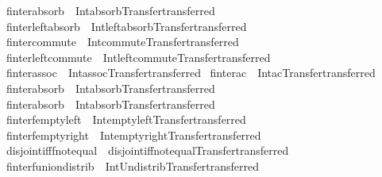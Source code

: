 \begin{isabellebody}
\isamarkupfalse%
\ finter{\isacharunderscore}absorb\ {\isacharequal}\ Int{\isacharunderscore}absorb{\isacharbrackleft}Transfer{\isachardot}transferred{\isacharbrackright}\isanewline
{}\isamarkupfalse%
\ finter{\isacharunderscore}left{\isacharunderscore}absorb\ {\isacharequal}\ Int{\isacharunderscore}left{\isacharunderscore}absorb{\isacharbrackleft}Transfer{\isachardot}transferred{\isacharbrackright}\isanewline
{}\isamarkupfalse%
\ finter{\isacharunderscore}commute\ {\isacharequal}\ Int{\isacharunderscore}commute{\isacharbrackleft}Transfer{\isachardot}transferred{\isacharbrackright}\isanewline
{}\isamarkupfalse%
\ finter{\isacharunderscore}left{\isacharunderscore}commute\ {\isacharequal}\ Int{\isacharunderscore}left{\isacharunderscore}commute{\isacharbrackleft}Transfer{\isachardot}transferred{\isacharbrackright}\isanewline
{}\isamarkupfalse%
\ finter{\isacharunderscore}assoc\ {\isacharequal}\ Int{\isacharunderscore}assoc{\isacharbrackleft}Transfer{\isachardot}transferred{\isacharbrackright}\isanewline
{}\isamarkupfalse%
\ finter{\isacharunderscore}ac\ {\isacharequal}\ Int{\isacharunderscore}ac{\isacharbrackleft}Transfer{\isachardot}transferred{\isacharbrackright}\isanewline
{}\isamarkupfalse%
\ finter{\isacharunderscore}absorb{}\ {\isacharequal}\ Int{\isacharunderscore}absorb{}{\isacharbrackleft}Transfer{\isachardot}transferred{\isacharbrackright}\isanewline
{}\isamarkupfalse%
\ finter{\isacharunderscore}absorb{}\ {\isacharequal}\ Int{\isacharunderscore}absorb{}{\isacharbrackleft}Transfer{\isachardot}transferred{\isacharbrackright}\isanewline
{}\isamarkupfalse%
\ finter{\isacharunderscore}fempty{\isacharunderscore}left\ {\isacharequal}\ Int{\isacharunderscore}empty{\isacharunderscore}left{\isacharbrackleft}Transfer{\isachardot}transferred{\isacharbrackright}\isanewline
{}\isamarkupfalse%
\ finter{\isacharunderscore}fempty{\isacharunderscore}right\ {\isacharequal}\ Int{\isacharunderscore}empty{\isacharunderscore}right{\isacharbrackleft}Transfer{\isachardot}transferred{\isacharbrackright}\isanewline
{}\isamarkupfalse%
\ disjoint{\isacharunderscore}iff{\isacharunderscore}fnot{\isacharunderscore}equal\ {\isacharequal}\ disjoint{\isacharunderscore}iff{\isacharunderscore}not{\isacharunderscore}equal{\isacharbrackleft}Transfer{\isachardot}transferred{\isacharbrackright}\isanewline
{}\isamarkupfalse%
\ finter{\isacharunderscore}funion{\isacharunderscore}distrib\ {\isacharequal}\ Int{\isacharunderscore}Un{\isacharunderscore}distrib{\isacharbrackleft}Transfer{\isachardot}transferred{\isacharbrackright}\isanewline

\end{isabellebody}
